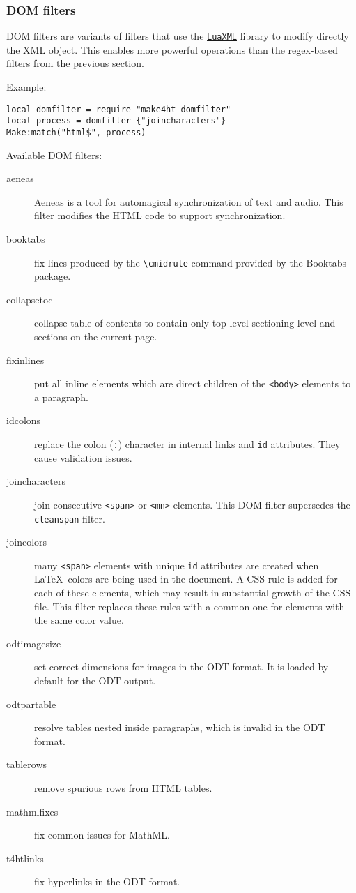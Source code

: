 \hypertarget{dom-filters}{%
\subsubsection{DOM filters}\label{dom-filters}}

DOM filters are variants of filters that use the
\href{https://ctan.org/pkg/luaxml}{\texttt{LuaXML}} library to modify
directly the XML object. This enables more powerful operations than the
regex-based filters from the previous section.

Example:

\begin{verbatim}
local domfilter = require "make4ht-domfilter"
local process = domfilter {"joincharacters"}
Make:match("html$", process)
\end{verbatim}

Available DOM filters:

\begin{description}
\item[aeneas]
\href{https://www.readbeyond.it/aeneas/}{Aeneas} is a tool for
automagical synchronization of text and audio. This filter modifies the
HTML code to support synchronization.
\item[booktabs]
fix lines produced by the \texttt{\textbackslash{}cmidrule} command
provided by the Booktabs package.
\item[collapsetoc]
collapse table of contents to contain only top-level sectioning level
and sections on the current page.
\item[fixinlines]
put all inline elements which are direct children of the
\texttt{\textless{}body\textgreater{}} elements to a paragraph.
\item[idcolons]
replace the colon (\texttt{:}) character in internal links and
\texttt{id} attributes. They cause validation issues.
\item[joincharacters]
join consecutive \texttt{\textless{}span\textgreater{}} or
\texttt{\textless{}mn\textgreater{}} elements. This DOM filter
supersedes the \texttt{cleanspan} filter.
\item[joincolors]
many \texttt{\textless{}span\textgreater{}} elements with unique
\texttt{id} attributes are created when \LaTeX~colors are being used in
the document. A CSS rule is added for each of these elements, which may
result in substantial growth of the CSS file. This filter replaces these
rules with a common one for elements with the same color value.
\item[odtimagesize]
set correct dimensions for images in the ODT format. It is loaded by
default for the ODT output.
\item[odtpartable]
resolve tables nested inside paragraphs, which is invalid in the ODT
format.
\item[tablerows]
remove spurious rows from HTML tables.
\item[mathmlfixes]
fix common issues for MathML.
\item[t4htlinks]
fix hyperlinks in the ODT format.
\end{description}

